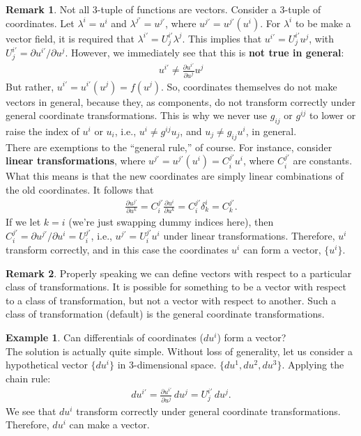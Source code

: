 \documentclass{book}
\theoremstyle{definition}
\newtheorem{rmk}{Remark}[section]
\newtheorem{exmp}{Example}[section]
\begin{document}
\begin{rmk}
	Not all 3-tuple of functions are vectors. Consider a 3-tuple of coordinates. Let $\lambda^i = u^i$ and $\lambda^{j'} = u^{j'}$, where $u^{j'} = u^{j'}(u^i)$. For $\lambda^i$ to be make a vector field, it is required that $\lambda^{i'} = U^{i'}_j\lambda^j$. This implies that $u^{i'} = U^{i'}_ju^j$, with $U^{i'}_j = \partial u^{i'}/\partial u^j$. However, we immediately see that this is \textbf{not true in general}:
	\begin{align*}
	\boxed{u^{i'} \neq \frac{\partial u^{i'}}{\partial u^j}u^j}
	\end{align*}
	But rather, $u^{i'} = u^{i'}(u^j) = f(u^j)$. So, coordinates themselves do not make vectors in general, because they, as components, do not transform correctly under general coordinate transformations. This is why we never use $g_{ij}$ or $g^{ij}$ to lower or raise the index of $u^i$ or $u_i$, i.e., $u^i \neq g^{ij}u_j$, and $u_j \neq g_{ij}u^i$, in general. \\
	
	There are exemptions to the ``general rule,'' of course. For instance, consider \textbf{linear transformations}, where $u^{j'} = u^{j'}(u^i) = C^{j'}_iu^i$, where $C^{j'}_i$ are constants. What this means is that the new coordinates are simply linear combinations of the old coordinates. It follows that
	\begin{align*}
	\frac{\partial u^{j'}}{\partial u^k} = C^{j'}_i\frac{\partial u^i}{\partial u^k} = C^{j'}_i\delta^i_k=C^{j'}_k.
	\end{align*}
	If we let $k=i$ (we're just swapping dummy indices here), then $C^{j'}_i = \partial u^{j'}/\partial u^i = U^{j'}_i$, i.e., $u^{j'} = U^{j'}_iu^i$ under linear transformations. Therefore, $u^i$ transform correctly, and in this case the coordinates $u^i$ can form a vector, $\{u^i\}$.
\end{rmk}
\begin{rmk}
	Properly speaking we can define vectors with respect to a particular class of transformations. It is possible for something to be a vector with respect to a class of transformation, but not a vector with respect to another. Such a class of transformation (default) is the general coordinate transformations. 
\end{rmk}
\begin{exmp}
	Can differentials of coordinates ($du^i$) form a vector?\\
	
	The solution is actually quite simple. Without loss of generality, let us consider a hypothetical vector $\{ du^i \}$ in 3-dimensional space. $\{du^1, du^2, du^3 \}$. Applying the chain rule:
	\begin{align*}
	du^{i'} = \frac{\partial u^{i'}}{\partial u^{j}}\,du^j = U^{i'}_j\,du^j.
	\end{align*}
	We see that $du^i$ transform correctly under general coordinate transformations. Therefore, $du^i$ can make a vector. 
\end{exmp}
\end{document}
